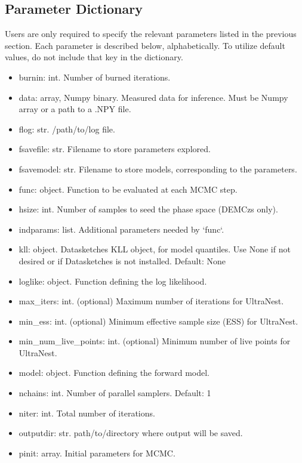 \documentclass[letterpaper, 12pt]{article}
\begin{document}
\subsection{Parameter Dictionary}

Users are only required to specify the relevant parameters listed in 
the previous section.  Each parameter is described below, alphabetically.
To utilize default values, do not include that key in the dictionary.

\begin{itemize}
\item burnin: int. Number of burned iterations.
\item data: array, Numpy binary. Measured data for inference. Must be Numpy 
                                 array or a path to a .NPY file.
\item flog: str.   /path/to/log file.
\item fsavefile: str. Filename to store parameters explored.
\item fsavemodel: str. Filename to store models, corresponding to the parameters.
\item func: object. Function to be evaluated at each MCMC step.
\item hsize: int. Number of samples to seed the phase space (DEMCzs only).
\item indparams: list. Additional parameters needed by `func`.
\item kll: object.  Datasketches KLL object, for model quantiles.
                    Use None if not desired or if Datasketches is not installed.
                    Default: None
\item loglike: object. Function defining the log likelihood.
\item max\_iters: int. (optional) Maximum number of iterations for UltraNest.
\item min\_ess: int. (optional) Minimum effective sample size (ESS) for UltraNest.
\item min\_num\_live\_points: int. (optional) Minimum number of live points for UltraNest.
\item model: object. Function defining the forward model.
\item nchains: int. Number of parallel samplers. Default: 1
\item niter: int. Total number of iterations.
\item outputdir: str. path/to/directory where output will be saved.
\item pinit: array. Initial parameters for MCMC.

\end{itemize}
\end{document}
